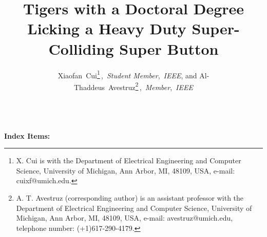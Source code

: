\documentclass[pdftex,letterpaper,11pt]{article}
\begin{document}
\title {\large  \bf \vspace{-10ex}
Tigers with a Doctoral Degree Licking a Heavy Duty Super-Colliding Super Button
\vspace{0ex}}
\date{}
\author{Xiaofan~Cui\thanks{X. Cui is with the Department
of Electrical Engineering and Computer Science, University of Michigan, Ann Arbor,
MI, 48109, USA, e-mail: cuixf@umich.edu.}\,,\ \textit{Student Member},~\textit{IEEE},
        and Al-Thaddeus~Avestruz\thanks{A. T. Avestruz (corresponding author) is an assistant professor with the Department
        of Electrical Engineering and Computer Science, University of Michigan, Ann Arbor, MI, 48109, USA, e-mail: avestruz@umich.edu, telephone number: (+1)617-290-4179.}\,,\ \textit{Member},~\textit{IEEE}
}
\maketitle
\thispagestyle{empty}
\pagestyle{empty}

\renewcommand{\figurename}{Fig.}



\\
\textbf{Index Items:}
\newpage







{\vspace{\baselineskip}


}
\end{document}
